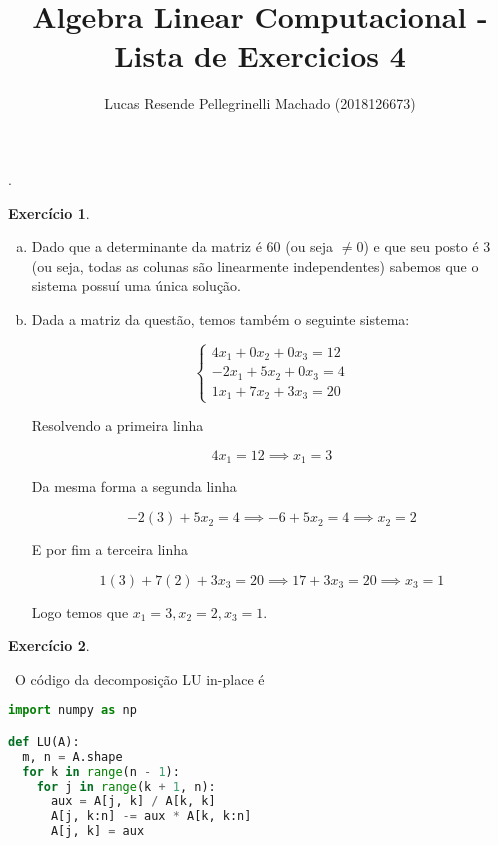 \documentclass[11pt]{article}
\begin{document}
  {}%
  {}%
  {}%
  {}%
  {\bfseries}%
  {.}%
  {\newline}%
  {}%

\theoremstyle{definition}
\theoremstyle{break}
\newtheorem{exerc}{Exercício}

\author{Lucas Resende Pellegrinelli Machado (2018126673)}
\title{Algebra Linear Computacional - Lista de Exercicios 4}
\maketitle

\medskip

\begin{exerc}
\begin{enumerate}[a.]
\
\item
Dado que a determinante da matriz é 60 (ou seja $\neq 0$) e que seu posto é $3$ (ou seja, todas as colunas são linearmente independentes) sabemos que o sistema possuí uma única solução.
\item
Dada a matriz da questão, temos também o seguinte sistema:

$$\begin{cases}
4x_1 + 0x_2 + 0x_3 = 12\\
-2x_1 + 5x_2 + 0x_3 = 4\\
1x_1 + 7x_2 + 3x_3 = 20
\end{cases}$$

Resolvendo a primeira linha

$$4x_1 = 12 \implies x_1 = 3$$

Da mesma forma a segunda linha

$$-2(3) + 5x_2 = 4 \implies -6 + 5x_2 = 4 \implies x_2 = 2$$

E por fim a terceira linha

$$1(3) + 7(2) + 3x_3 = 20 \implies 17 + 3x_3 = 20 \implies x_3 = 1$$

Logo temos que $x_1 = 3, x_2 = 2, x_3 = 1$.
\\
\end{enumerate}
\end{exerc}

\begin{exerc}
\begin{enumerate}
\
O código da decomposição LU in-place é
\begin{lstlisting}[language=Python]
import numpy as np

def LU(A):
  m, n = A.shape
  for k in range(n - 1):
    for j in range(k + 1, n):
      aux = A[j, k] / A[k, k]
      A[j, k:n] -= aux * A[k, k:n]
      A[j, k] = aux
\end{lstlisting}

\end{enumerate}
\end{exerc}
\end{document}
